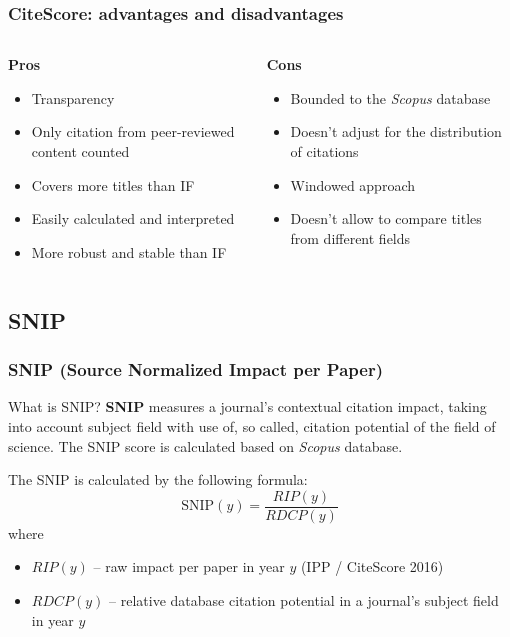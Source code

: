 \documentclass{beamer}
\newcommand{\pros}{\item[{\textcolor[HTML]{3C8031}{\ding{51}}}]}
\newcommand{\cons}{\item[\textcolor{red}{\ding{54}}]}
\newcommand{\sco}{\textit{Scopus} }
\begin{document}
\begin{frame}
    \frametitle{CiteScore: advantages and disadvantages}
    \begin{columns}[T]
        \begin{column}{.5\textwidth}
            \centering \textbf{Pros}
            \begin{itemize}[<+->]
                \pros Transparency
                \pros Only citation from peer-reviewed content counted
                \pros Covers more titles than IF
                \pros Easily calculated and interpreted
                \pros More robust and stable than IF
            \end{itemize}
        \end{column}
        \begin{column}{.5\textwidth}
            \centering \textbf{Cons}
            \begin{itemize}[<+->]
                \cons Bounded to the \sco database
                \cons Doesn’t adjust for the distribution of citations
                \cons Windowed approach
                \cons Doesn't allow to compare titles from different fields
            \end{itemize}
        \end{column}
    \end{columns}
\end{frame}

\subsection{SNIP}
\begin{frame}
    \frametitle{SNIP (Source Normalized Impact per Paper)}
    \begin{block}{What is SNIP?}
        \textbf{SNIP}\cite{moed2010measuring} measures a journal's contextual
        citation impact, taking into account subject field with use of, so called,
        citation potential of the field of science. The SNIP score is calculated based on
        \sco database.
    \end{block}

    The SNIP is calculated by the following formula:
    \[
        \text{SNIP}(y) = \frac{RIP(y)}{RDCP(y)}
    \]
    where
    \begin{itemize}
        \item $RIP(y)$ -- raw impact per paper in year $y$ (IPP / CiteScore 2016)
        \item $RDCP(y)$ -- relative database citation
              potential in a journal’s subject field in year $y$
    \end{itemize}
\end{frame}
\end{document}
